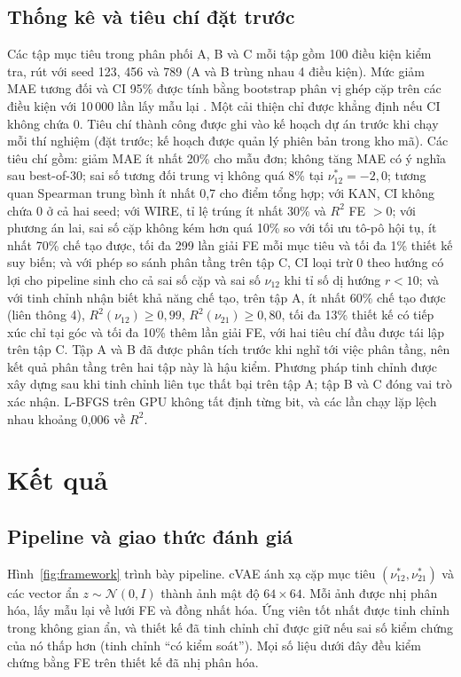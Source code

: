 \documentclass[a4paper,11pt]{article}
\newcommand{\nuot}{\nu_{12}}
\newcommand{\nuto}{\nu_{21}}
\newcommand{\RR}{R^2}
\begin{document}
\subsection{Thống kê và tiêu chí đặt trước}
\label{sec:stats}
Các tập mục tiêu trong phân phối A, B và C mỗi tập gồm 100 điều kiện kiểm
tra, rút với seed 123, 456 và 789 (A và B trùng nhau 4 điều kiện). Mức giảm
MAE tương đối và CI 95\% được tính bằng bootstrap phân vị ghép cặp trên các
điều kiện với 10\,000 lần lấy mẫu lại \citep{efron1993bootstrap}. Một cải
thiện chỉ được khẳng định nếu CI không chứa 0. Tiêu chí thành công được ghi
vào kế hoạch dự án trước khi chạy mỗi thí nghiệm (đặt trước; kế hoạch được
quản lý phiên bản trong kho mã). Các tiêu chí gồm: giảm MAE ít nhất 20\% cho
mẫu đơn; không tăng MAE có ý nghĩa sau best-of-30; sai số tương đối trung vị
không quá 8\% tại $\nuot^{*}=-2,0$; tương quan Spearman trung bình ít nhất
0,7 cho điểm tổng hợp; với KAN, CI không chứa 0 ở cả hai seed; với WIRE, tỉ
lệ trúng ít nhất 30\% và $\RR$ FE $>0$; với phương án lai, sai số cặp không
kém hơn quá 10\% so với tối ưu tô-pô hội tụ, ít nhất 70\% chế tạo được, tối
đa 299 lần giải FE mỗi mục tiêu và tối đa 1\% thiết kế suy biến; và với phép
so sánh phân tầng trên tập C, CI loại trừ 0 theo hướng có lợi cho pipeline
sinh cho cả sai số cặp và sai số $\nuot$ khi tỉ số dị hướng $r<10$; và với
tinh chỉnh nhận biết khả năng chế tạo, trên tập A, ít nhất 60\% chế tạo được
(liên thông 4), $\RR(\nuot)\ge0{,}99$, $\RR(\nuto)\ge0{,}80$, tối đa 13\%
thiết kế có tiếp xúc chỉ tại góc và tối đa 10\% thêm lần giải FE, với hai
tiêu chí đầu được tái lập trên tập C. Tập A và B đã được phân tích trước khi nghĩ tới việc phân tầng, nên kết quả phân tầng
trên hai tập này là hậu kiểm. Phương pháp tinh chỉnh được xây dựng sau khi
tinh chỉnh liên tục thất bại trên tập A; tập B và C đóng vai trò xác nhận.
L-BFGS trên GPU không tất định từng bit, và các lần chạy lặp lệch nhau
khoảng 0,006 về $\RR$.

\section{Kết quả}

\subsection{Pipeline và giao thức đánh giá}

Hình~\ref{fig:framework} trình bày pipeline. cVAE ánh xạ cặp mục tiêu
$(\nuot^{*},\nuto^{*})$ và các vector ẩn $z\sim\mathcal N(0,I)$ thành ảnh
mật độ $64\times64$. Mỗi ảnh được nhị phân hóa, lấy mẫu lại về lưới FE và
đồng nhất hóa. Ứng viên tốt nhất được tinh chỉnh trong không gian ẩn, và
thiết kế đã tinh chỉnh chỉ được giữ nếu sai số kiểm chứng của nó thấp hơn
(tinh chỉnh ``có kiểm soát''). Mọi số liệu dưới đây đều kiểm chứng bằng FE
trên thiết kế đã nhị phân hóa.
\end{document}
